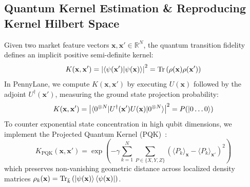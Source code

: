 \subsection{Quantum Kernel Estimation \& Reproducing Kernel Hilbert Space}
Given two market feature vectors $\mathbf{x}, \mathbf{x}' \in \mathbb{R}^N$, the quantum transition fidelity defines an implicit positive semi-definite kernel:
\begin{equation}
    K(\mathbf{x}, \mathbf{x}') = \left| \braket{\psi(\mathbf{x}') | \psi(\mathbf{x})} \right|^2 = \mathrm{Tr}\left( \rho(\mathbf{x}) \rho(\mathbf{x}') \right)
\end{equation}
In PennyLane, we compute $K(\mathbf{x}, \mathbf{x}')$ by executing $U(\mathbf{x})$ followed by the adjoint $U^\dagger(\mathbf{x}')$, measuring the ground state projection probability:
\begin{equation}
    K(\mathbf{x}, \mathbf{x}') = \left| \braket{0^{\otimes N} | U^\dagger(\mathbf{x}') U(\mathbf{x}) | 0^{\otimes N}} \right|^2 = P(|0\dots 0\rangle)
\end{equation}
To counter exponential state concentration in high qubit dimensions, we implement the Projected Quantum Kernel (PQK)~\cite{huang2021power}:
\begin{equation}
    K_{\text{PQK}}(\mathbf{x}, \mathbf{x}') = \exp\left( -\gamma \sum_{k=1}^N \sum_{P \in \{X, Y, Z\}} (\langle P_k \rangle_{\mathbf{x}} - \langle P_k \rangle_{\mathbf{x}'})^2 \right)
\end{equation}
which preserves non-vanishing geometric distance across localized density matrices $\rho_k(\mathbf{x}) = \mathrm{Tr}_{\bar{k}}\left(\ket{\psi(\mathbf{x})}\bra{\psi(\mathbf{x})}\right)$.
